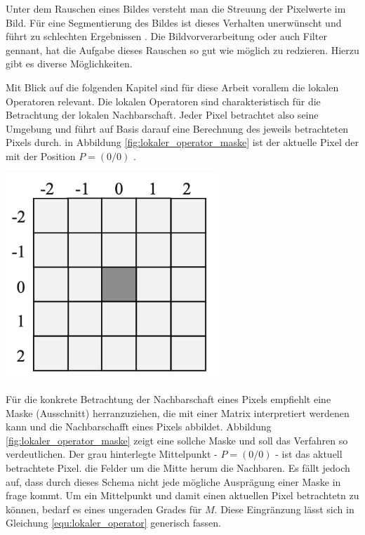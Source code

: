 Unter dem Rauschen eines Bildes versteht man die Streuung der Pixelwerte im Bild.
Für eine Segmentierung des Bildes ist dieses Verhalten unerwünscht und führt zu
schlechten Ergebnissen \citep[vgl.][Seite 51]{handels2000}. Die Bildvorverarbeitung
oder auch Filter gennant, hat die Aufgabe dieses Rauschen so gut wie möglich zu
redzieren. Hierzu gibt es diverse Möglichkeiten.

\begin{minipage}{0.40\textwidth}
	Mit Blick auf die folgenden Kapitel sind für diese Arbeit vorallem die lokalen
	Operatoren relevant. Die lokalen Operatoren sind charakteristisch für die
	Betrachtung der lokalen Nachbarschaft. Jeder Pixel betrachtet also seine Umgebung
	und führt auf Basis darauf eine Berechnung des jeweils betrachteten Pixels durch.
	in Abbildung \ref{fig:lokaler_operator_maske} ist der aktuelle Pixel der mit
	der Position $P = (0/0)$ \citep[vgl.][Seite 52]{handels2000}.
\end{minipage}
\hfill
\begin{minipage}{0.50\textwidth}
	\centering
	\includegraphics[width=0.60\textwidth]{img/lokaler_operator_maske.jpg}
	\label{fig:lokaler_operator_maske}
\end{minipage}

Für die konkrete Betrachtung der Nachbarschaft eines Pixels empfiehlt \citet[Seite
52]{handels2000} eine Maske (Ausschnitt) herranzuziehen, die mit einer Matrix interpretiert
werdenen kann und die Nachbarschafft eines Pixels abbildet. Abbildung
\ref{fig:lokaler_operator_maske} zeigt eine sollche Maske und soll das Verfahren
so verdeutlichen. Der grau hinterlegte Mittelpunkt - $P = (0/0)$ - ist das aktuell
betrachtete Pixel. die Felder um die Mitte herum die Nachbaren. Es fällt jedoch auf,
dass durch dieses Schema nicht jede mögliche Ausprägung einer Maske in frage
kommt. Um ein Mittelpunkt und damit einen aktuellen Pixel betrachtetn zu können,
bedarf es eines ungeraden Grades für $M$. Diese Eingränzung lässt sich in Gleichung
\ref{equ:lokaler_operator} generisch fassen.

